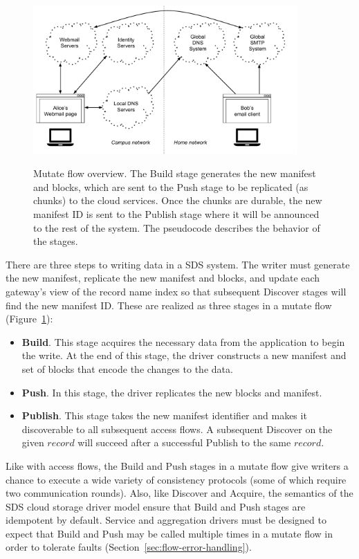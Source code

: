 \begin{figure}[h]
   \caption{Mutate flow overview.  The Build stage generates the new manifest
   and blocks, which are sent to the Push stage to be replicated (as chunks) to
   the cloud services.  Once the chunks are durable, the new manifest ID is
   sent to the Publish stage where it will be announced to the rest of the
   system.  The pseudocode describes the behavior of the stages.}
   \centering
   \includegraphics[width=0.9\textwidth,page=8]{figures/dissertation-figures}
   \label{fig:chap2-mutate-flow}
\end{figure}

There are three steps to writing data in a SDS system.  The writer must
generate the new manifest, replicate the new manifest and blocks, and update
each gateway's view of the record name index so that subsequent Discover stages
will find the new manifest ID.  These are realized as three stages 
in a mutate flow (Figure~\ref{fig:chap2-mutate-flow}):

\begin{itemize}
    \item \textbf{Build}.  This stage acquires the necessary data from the
application to begin the write.  At the end of this stage, the driver constructs
a new manifest and set of blocks that encode the changes to the data. 
    \item \textbf{Push}.  In this stage, the driver replicates the new blocks and
manifest.
    \item \textbf{Publish}.  This stage takes the new manifest identifier and makes
it discoverable to all subsequent access flows.  A subsequent Discover on the
given $record$ will succeed after a successful Publish to the same $record$.
\end{itemize}

Like with access flows, the Build and Push stages in a mutate flow give writers a
chance to execute a wide variety of consistency protocols (some of which require
two communication rounds).  Also, like Discover and Acquire, the semantics of the SDS cloud storage driver model
ensure that Build and Push stages are idempotent by default.  Service and
aggregation drivers must be designed to expect that Build and Push may be called
multiple times in a mutate flow in order to tolerate faults
(Section~\ref{sec:flow-error-handling}).

